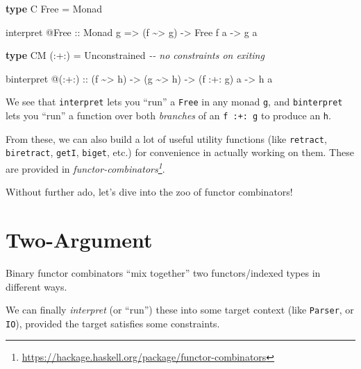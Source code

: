 \documentclass[]{article}
\newenvironment{Shaded}{}{}
\newcommand{\CommentTok}[1]{\textcolor[rgb]{0.38,0.63,0.69}{\textit{#1}}}
\newcommand{\DataTypeTok}[1]{\textcolor[rgb]{0.56,0.13,0.00}{#1}}
\newcommand{\KeywordTok}[1]{\textcolor[rgb]{0.00,0.44,0.13}{\textbf{#1}}}
\newcommand{\NormalTok}[1]{#1}
\newcommand{\OperatorTok}[1]{\textcolor[rgb]{0.40,0.40,0.40}{#1}}
\newcommand{\OtherTok}[1]{\textcolor[rgb]{0.00,0.44,0.13}{#1}}
\renewcommand{\href}[2]{#2\footnote{\url{#1}}}
\begin{document}
\begin{Shaded}
\begin{Highlighting}[]
\KeywordTok{type} \DataTypeTok{C} \DataTypeTok{Free} \OtherTok{=} \DataTypeTok{Monad}

\NormalTok{interpret }\OperatorTok{@}\DataTypeTok{Free}
\OtherTok{    ::} \DataTypeTok{Monad}\NormalTok{ g}
    \OtherTok{=>}\NormalTok{ (f }\OperatorTok{\textasciitilde{}>}\NormalTok{ g)}
    \OtherTok{{-}>} \DataTypeTok{Free}\NormalTok{ f a}
    \OtherTok{{-}>}\NormalTok{ g a}

\KeywordTok{type} \DataTypeTok{CM}\NormalTok{ (}\OperatorTok{:+:}\NormalTok{) }\OtherTok{=} \DataTypeTok{Unconstrained}   \CommentTok{{-}{-} no constraints on exiting}

\NormalTok{binterpret }\OperatorTok{@}\NormalTok{(}\OperatorTok{:+:}\NormalTok{)}
\OtherTok{    ::}\NormalTok{ (f }\OperatorTok{\textasciitilde{}>}\NormalTok{ h)}
    \OtherTok{{-}>}\NormalTok{ (g }\OperatorTok{\textasciitilde{}>}\NormalTok{ h)}
    \OtherTok{{-}>}\NormalTok{ (f }\OperatorTok{:+:}\NormalTok{ g) a}
    \OtherTok{{-}>}\NormalTok{ h a}
\end{Highlighting}
\end{Shaded}

We see that \texttt{interpret} lets you ``run'' a \texttt{Free} in any monad
\texttt{g}, and \texttt{binterpret} lets you ``run'' a function over both
\emph{branches} of an \texttt{f\ :+:\ g} to produce an \texttt{h}.

From these, we can also build a lot of useful utility functions (like
\texttt{retract}, \texttt{biretract}, \texttt{getI}, \texttt{biget}, etc.) for
convenience in actually working on them. These are provided in
\emph{\href{https://hackage.haskell.org/package/functor-combinators}{functor-combinators}}.

Without further ado, let's dive into the zoo of functor combinators!

\hypertarget{two-argument}{%
\section{Two-Argument}\label{two-argument}}

Binary functor combinators ``mix together'' two functors/indexed types in
different ways.

We can finally \emph{interpret} (or ``run'') these into some target context
(like \texttt{Parser}, or \texttt{IO}), provided the target satisfies some
constraints.
\end{document}
